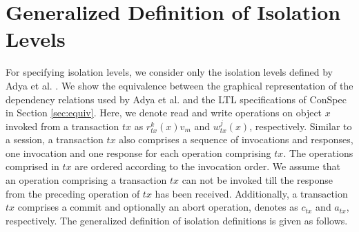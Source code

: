 \documentclass[acmlarge, ,11pt]{acmart}
\begin{document}


 \section{Generalized Definition of Isolation Levels}
  For specifying isolation levels, we consider only the isolation levels defined by Adya et al. \cite{DBLP:conf/icde/AdyaLO00}. We show the equivalence between the graphical representation of the dependency relations used by Adya et al. and the LTL specifications of ConSpec in Section \ref{sec:equiv}.
 Here, we denote read and write operations on object $x$ invoked from a transaction $\mathit{tx}$ as $r^k_{\mathit{tx}}(x){v_m}$ and $w^j_{\mathit{tx}}(x)$, respectively. Similar to a session, a transaction ${\mathit{tx}}$ also comprises a sequence of invocations and responses, one invocation and one response for each operation comprising ${\mathit{tx}}$. The operations comprised in ${\mathit{tx}}$ are ordered according to the invocation order. We assume that an operation comprising a transaction ${\mathit{tx}}$ can not be invoked till the response from the preceding operation of ${\mathit{tx}}$ has been received. Additionally, a transaction ${\mathit{tx}}$ comprises a commit and optionally an abort operation, denotes as $c_\mathit{tx}$ and $a_\mathit{tx}$, respectively.  
 The generalized definition of isolation definitions is given as follows.  
\end{document}
